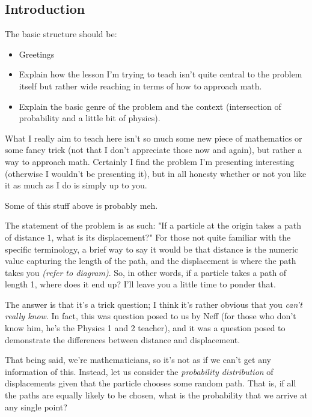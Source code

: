 
\subsection*{Introduction}

The basic structure should be:
\begin{itemize}
    \item Greetings
    \item Explain how the lesson I'm trying to teach isn't quite central to the
        problem itself but rather wide reaching in terms of how to approach math.
    \item Explain the basic genre of the problem and the context (intersection
        of probability and a little bit of physics).
\end{itemize}

What I really aim to teach here isn't so much some new piece of mathematics or
some fancy trick (not that I don't appreciate those now and again), but rather
a way to approach math. Certainly I find the problem I'm presenting interesting
(otherwise I wouldn't be presenting it), but in all honesty whether or not you
like it as much as I do is simply up to you.

Some of this stuff above is probably meh.

The statement of the problem is as such: "If a particle at the origin takes a
path of distance \( 1 \), what is its displacement?" For those not quite
familiar with the specific terminology, a brief way to say it would be that
distance is the numeric value capturing the length of the path, and the
displacement is where the path takes you \textit{(refer to diagram)}. So, in
other words, if a particle takes a path of length 1, where does it end up? I'll
leave you a little time to ponder that.

The answer is that it's a trick question; I think it's rather obvious that you
\textit{can't really know}. In fact, this was question posed to us by Neff (for
those who don't know him, he's the Physics 1 and 2 teacher), and it was a
question posed to demonstrate the differences between distance and
displacement.

That being said, we're mathematicians, so it's not as if we can't get any
information of this. Instead, let us consider the \textit{probability
distribution} of displacements given that the particle chooses some random
path. That is, if all the paths are equally likely to be chosen, what is the
probability that we arrive at any single point?

